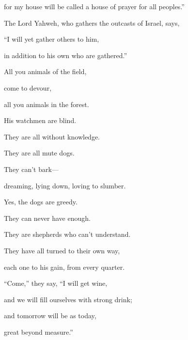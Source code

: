 {\par }{\QB for my house will be called a house of prayer for all peoples.”
\par }{\Q {}The Lord Yahweh, who gathers the outcasts of Israel, says,
\par }{\QB “I will yet gather others to him,
\par }{\QB in addition to his own who are gathered.”
\par }{\BB \par }{\Q {}All you animals of the field,
\par }{\QB come to devour,
\par }{\QB all you animals in the forest.
\par }{\Q {}His watchmen are blind.
\par }{\QB They are all without knowledge.
\par }{\Q They are all mute dogs.
\par }{\QB They can’t bark—
\par }{\QB dreaming, lying down, loving to slumber.
\par }{\Q {}Yes, the dogs are greedy.
\par }{\QB They can never have enough.
\par }{\Q They are shepherds who can’t understand.
\par }{\QB They have all turned to their own way,
\par }{\QB each one to his gain, from every quarter.
\par }{\Q {}“Come,” they say, “I will get wine,
\par }{\QB and we will fill ourselves with strong drink;
\par }{\QB and tomorrow will be as today,
\par }{\QB great beyond measure.”

}
